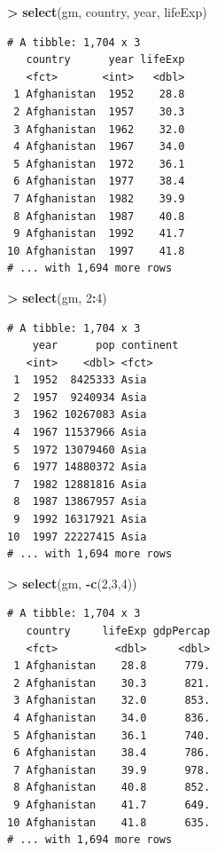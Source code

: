 \documentclass[
]{krantz}
\makeatletter
\newenvironment{Shaded}{\begin{snugshade}}{\end{snugshade}}
\newcommand{\DecValTok}[1]{\textcolor[rgb]{0.06,0.06,0.06}{#1}}
\newcommand{\KeywordTok}[1]{\textcolor[rgb]{0.27,0.27,0.27}{\textbf{#1}}}
\newcommand{\NormalTok}[1]{#1}
\newcommand{\OperatorTok}[1]{\textcolor[rgb]{0.43,0.43,0.43}{\textbf{#1}}}
\newcommand{\StringTok}[1]{\textcolor[rgb]{0.5,0.5,0.5}{#1}}
\newenvironment{kframe}{%
\medskip{}
\setlength{\fboxsep}{.8em}
 \def\at@end@of@kframe{}%
 \ifinner\ifhmode%
  \def\at@end@of@kframe{\end{minipage}}%
  \begin{minipage}{\columnwidth}%
 \fi\fi%
 \def\FrameCommand##1{\hskip\@totalleftmargin \hskip-\fboxsep
 \colorbox{shadecolor}{##1}\hskip-\fboxsep
     \hskip-\linewidth \hskip-\@totalleftmargin \hskip\columnwidth}%
 \MakeFramed {\advance\hsize-\width
   \@totalleftmargin\z@ \linewidth\hsize
   \@setminipage}}%
 {\par\unskip\endMakeFramed%
 \at@end@of@kframe}
\renewenvironment{Shaded}{\begin{kframe}}{\end{kframe}}
\makeatother
\begin{document}
\begin{Shaded}
\begin{Highlighting}[]
\OperatorTok{\textgreater{}}\StringTok{ }\KeywordTok{select}\NormalTok{(gm, country, year, lifeExp)}
\end{Highlighting}
\end{Shaded}

\begin{verbatim}
# A tibble: 1,704 x 3
   country      year lifeExp
   <fct>       <int>   <dbl>
 1 Afghanistan  1952    28.8
 2 Afghanistan  1957    30.3
 3 Afghanistan  1962    32.0
 4 Afghanistan  1967    34.0
 5 Afghanistan  1972    36.1
 6 Afghanistan  1977    38.4
 7 Afghanistan  1982    39.9
 8 Afghanistan  1987    40.8
 9 Afghanistan  1992    41.7
10 Afghanistan  1997    41.8
# ... with 1,694 more rows
\end{verbatim}

\begin{Shaded}
\begin{Highlighting}[]
\OperatorTok{\textgreater{}}\StringTok{ }\KeywordTok{select}\NormalTok{(gm, }\DecValTok{2}\OperatorTok{:}\DecValTok{4}\NormalTok{)}
\end{Highlighting}
\end{Shaded}

\begin{verbatim}
# A tibble: 1,704 x 3
    year      pop continent
   <int>    <dbl> <fct>    
 1  1952  8425333 Asia     
 2  1957  9240934 Asia     
 3  1962 10267083 Asia     
 4  1967 11537966 Asia     
 5  1972 13079460 Asia     
 6  1977 14880372 Asia     
 7  1982 12881816 Asia     
 8  1987 13867957 Asia     
 9  1992 16317921 Asia     
10  1997 22227415 Asia     
# ... with 1,694 more rows
\end{verbatim}

\begin{Shaded}
\begin{Highlighting}[]
\OperatorTok{\textgreater{}}\StringTok{ }\KeywordTok{select}\NormalTok{(gm, }\OperatorTok{{-}}\KeywordTok{c}\NormalTok{(}\DecValTok{2}\NormalTok{,}\DecValTok{3}\NormalTok{,}\DecValTok{4}\NormalTok{))}
\end{Highlighting}
\end{Shaded}

\begin{verbatim}
# A tibble: 1,704 x 3
   country     lifeExp gdpPercap
   <fct>         <dbl>     <dbl>
 1 Afghanistan    28.8      779.
 2 Afghanistan    30.3      821.
 3 Afghanistan    32.0      853.
 4 Afghanistan    34.0      836.
 5 Afghanistan    36.1      740.
 6 Afghanistan    38.4      786.
 7 Afghanistan    39.9      978.
 8 Afghanistan    40.8      852.
 9 Afghanistan    41.7      649.
10 Afghanistan    41.8      635.
# ... with 1,694 more rows
\end{verbatim}
\end{document}
